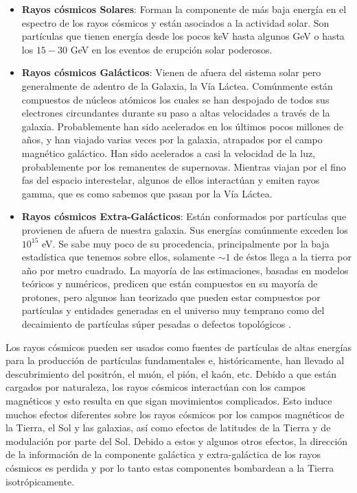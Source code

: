 \documentclass[a4paper,10pt]{article}
\numberwithin{equation}{section}
\begin{document}
\begin{itemize}
 \item \textbf{Rayos cósmicos Solares}: Forman la componente de más baja energía 
 en el espectro de los rayos cósmicos y están asociados a la actividad solar. Son 
 partículas que tienen energía desde los pocos keV hasta algunos GeV o hasta 
 los $15-30$ GeV en los eventos de erupción solar poderosos.
 \item \textbf{Rayos cósmicos Galácticos}: Vienen de afuera del sistema solar pero 
 generalmente de adentro de la Galaxia, la Vía Láctea. Comúnmente están compuestos 
 de núcleos atómicos los cuales se han despojado de todos sus electrones circundantes 
 durante su paso a altas velocidades a través de la galaxia. Probablemente han sido 
 acelerados en los últimos pocos millones de años, y han viajado varias veces por 
 la galaxia, atrapados por el campo magnético galáctico. Han sido acelerados a 
 casi la velocidad de la luz, probablemente por los remanentes de supernovas. Mientras 
 viajan por el fino fas del espacio interestelar, algunos de ellos interactúan y 
 emiten rayos gamma, que es como sabemos que pasan por la Vía Láctea.
 \item \textbf{Rayos cósmicos Extra-Galácticos}: Están conformados por partículas 
 que provienen de afuera de nuestra galaxia. Sus energías comúnmente exceden los 
 $10^{15}$ eV. Se sabe muy poco de su procedencia, principalmente por la baja 
 estadística que tenemos sobre ellos, solamente $\sim 1$ de éstos llega a la 
 tierra por año por metro cuadrado. La mayoría de las estimaciones, basadas en 
 modelos teóricos y numéricos, predicen que están compuestos en su mayoría 
 de protones, pero algunos han teorizado que pueden estar compuestos por 
 partículas y entidades generadas en el universo muy temprano como del 
 decaimiento de partículas súper pesadas o defectos topológicos \cite{}.
\end{itemize}

Los rayos cósmicos pueden ser usados como fuentes de partículas de altas energías 
para la producción de partículas fundamentales e, históricamente, han llevado 
al descubrimiento del positrón, el muón, el pión, el kaón, etc. Debido a que 
están cargados por naturaleza, los rayos cósmicos interactúan con los 
campos magnéticos y esto resulta en que sigan movimientos complicados. Esto 
induce muchos efectos diferentes sobre los rayos cósmicos por los campos magnéticos 
de la Tierra, el Sol y las galaxias, así como efectos de latitudes de la Tierra 
y de modulación por parte del Sol. Debido a estos y algunos otros efectos, 
la dirección de la información de la componente galáctica y extra-galáctica 
de los rayos cósmicos es perdida y por lo tanto estas componentes bombardean 
a la Tierra isotrópicamente. 
\end{document}
